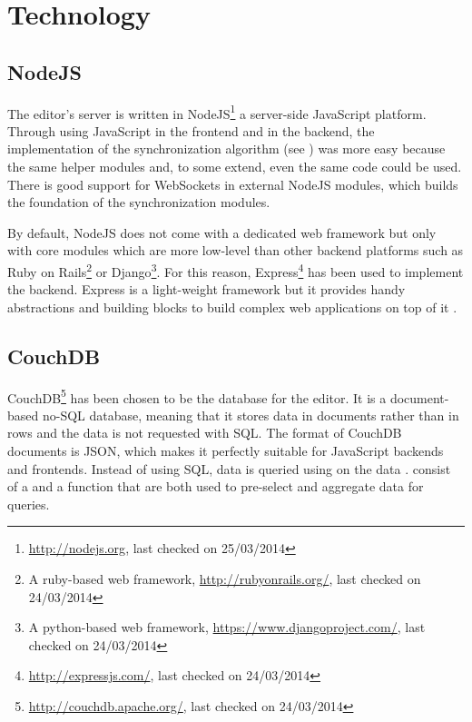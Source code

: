 \section{Technology}
\label{backend-technology}

\subsection{NodeJS}
\label{backend-technology-nodejs}

The editor's server is written in NodeJS\footnote{\url{http://nodejs.org}, last checked on 25/03/2014} a server-side JavaScript platform. Through using JavaScript in the frontend and in the backend, the implementation of the synchronization algorithm (see ) was more easy because the same helper modules and, to some extend, even the same code could be used. There is good support for WebSockets in external NodeJS modules, which builds the foundation of the synchronization modules.

By default, NodeJS does not come with a dedicated web framework but only with core modules which are more low-level than other backend platforms such as Ruby on Rails\footnote{A ruby-based web framework, \url{http://rubyonrails.org/}, last checked on 24/03/2014} or Django\footnote{A python-based web framework, \url{https://www.djangoproject.com/}, last checked on 24/03/2014}. For this reason, Express\footnote{\url{http://expressjs.com/}, last checked on 24/03/2014} has been used to implement the backend. Express is a light-weight framework but it provides handy abstractions and building blocks to build complex web applications on top of it \cite[p. 176f]{cantelon2013node}.

\subsection{CouchDB}
\label{backend-technology-couchdb}

CouchDB\footnote{\url{http://couchdb.apache.org/}, last checked on 24/03/2014} has been chosen to be the database for the editor. It is a document-based no-SQL database, meaning that it stores data in documents rather than in rows and the data is not requested with SQL. The format of CouchDB documents is JSON, which makes it perfectly suitable for JavaScript backends and frontends. Instead of using SQL, data is queried using  on the data \cite[chapter: Finding Your Data with Views]{anderson2010couchdb}.  consist of a  and a  function that are both used to pre-select and aggregate data for queries.

